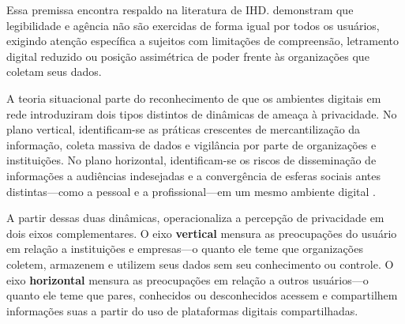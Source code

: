 \documentclass[
	12pt,				%
	oneside,			%
	a4paper,			%
	english,			%
	brazil				%
	]{abntex2ppgsi}
\begin{document}
    Essa premissa encontra respaldo na literatura de IHD.  demonstram que legibilidade e agência não são exercidas de forma igual por todos os usuários, exigindo atenção específica a sujeitos com limitações de compreensão, letramento digital reduzido ou posição assimétrica de poder frente às organizações que coletam seus dados.

    A teoria situacional parte do reconhecimento de que os ambientes digitais em rede introduziram dois tipos distintos de dinâmicas de ameaça à privacidade. No plano vertical, identificam-se as práticas crescentes de mercantilização da informação, coleta massiva de dados e vigilância por parte de organizações e instituições. No plano horizontal, identificam-se os riscos de disseminação de informações a audiências indesejadas e a convergência de esferas sociais antes distintas---como a pessoal e a profissional---em um mesmo ambiente digital \cite{masur2019situational}.

    A partir dessas duas dinâmicas,  operacionaliza a percepção de privacidade em dois eixos complementares. O eixo \textbf{vertical} mensura as preocupações do usuário em relação a instituições e empresas---o quanto ele teme que organizações coletem, armazenem e utilizem seus dados sem seu conhecimento ou controle. O eixo \textbf{horizontal} mensura as preocupações em relação a outros usuários---o quanto ele teme que pares, conhecidos ou desconhecidos acessem e compartilhem informações suas a partir do uso de plataformas digitais compartilhadas.
\end{document}
